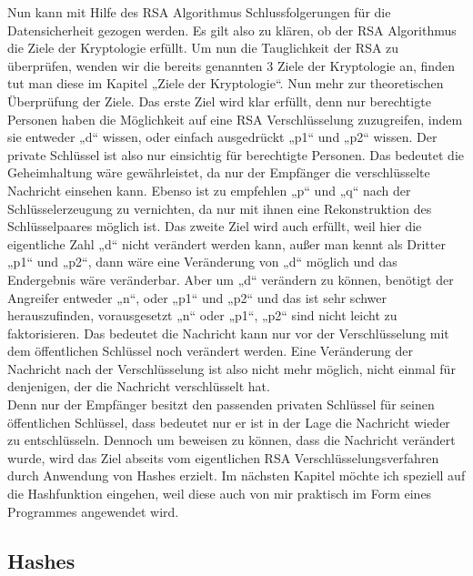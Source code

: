 Nun kann mit Hilfe des RSA Algorithmus Schlussfolgerungen für die Datensicherheit gezogen werden. Es gilt also zu klären, ob der RSA Algorithmus die Ziele der Kryptologie erfüllt. Um nun die Tauglichkeit der RSA zu überprüfen, wenden wir die bereits genannten 3 Ziele der Kryptologie an, finden tut man diese im Kapitel „Ziele der Kryptologie“. Nun mehr zur theoretischen Überprüfung der Ziele. Das erste Ziel wird klar erfüllt, denn nur berechtigte Personen haben die Möglichkeit auf eine RSA Verschlüsselung zuzugreifen, indem sie entweder „d“ wissen, oder einfach ausgedrückt „p1“ und „p2“ wissen. Der private Schlüssel ist also nur einsichtig für berechtigte Personen. Das bedeutet die Geheimhaltung wäre gewährleistet, da nur der Empfänger die verschlüsselte Nachricht einsehen kann. Ebenso ist zu empfehlen „p“ und „q“ nach der Schlüsselerzeugung zu vernichten, da nur mit ihnen eine Rekonstruktion des Schlüsselpaares möglich ist. Das zweite Ziel wird auch erfüllt, weil hier die eigentliche Zahl „d“ nicht verändert werden kann, außer man kennt als Dritter „p1“ und „p2“, dann wäre eine Veränderung von „d“ möglich und das Endergebnis wäre veränderbar. Aber um „d“ verändern zu können, benötigt der Angreifer entweder „n“, oder „p1“ und „p2“ und das ist sehr schwer herauszufinden, vorausgesetzt „n“ oder „p1“, „p2“ sind nicht leicht zu faktorisieren. Das bedeutet die Nachricht kann nur vor der Verschlüsselung mit dem öffentlichen Schlüssel noch verändert werden. Eine Veränderung der Nachricht nach der Verschlüsselung ist also nicht mehr möglich, nicht einmal für denjenigen, der die Nachricht verschlüsselt hat. \\

Denn nur der Empfänger besitzt den passenden privaten Schlüssel für seinen öffentlichen Schlüssel, dass bedeutet nur er ist in der Lage die Nachricht wieder zu entschlüsseln. Dennoch um beweisen zu können, dass die Nachricht verändert wurde, wird das Ziel abseits vom eigentlichen RSA Verschlüsselungsverfahren durch Anwendung von Hashes erzielt. Im nächsten Kapitel möchte ich speziell auf die Hashfunktion eingehen, weil diese auch von mir praktisch im Form eines Programmes angewendet wird.


\subsection{Hashes}

